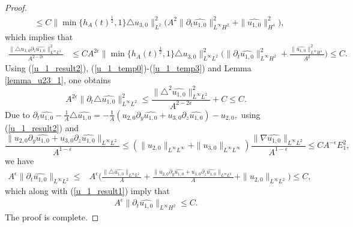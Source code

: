\documentclass[12pt, reqno]{amsart}
\numberwithin{equation}{section}
\begin{document}
\begin{proof}
\begin{equation*}
\begin{aligned}
				&\leq C\|\min\{h_A(t)^{\frac{1}{2}},1\}\triangle u_{3,0}\|^2_{L^2}
				\big(A^2\|\partial_t\widehat{u_{1,0}}\|^2_{L^{\infty}H^2}
				+\|\widehat{u_{1,0}}\|^2_{H^4}\big),
			\end{aligned}
		\end{equation*}
		which implies that 
		\begin{equation}\label{u_1_temp3}
			\begin{aligned}			
				\frac{\|\triangle u_{3,0}\partial_z\widehat{u_{1,0}}\|^2_{L^{\infty}L^2}}{A^{2-2\epsilon}}
				&\leq CA^{2\epsilon}\|\min\{h_A(t)^{\frac{1}{2}},1\}
				\triangle u_{3,0}\|^2_{L^{\infty}L^2}
				\Big(\|\partial_t\widehat{u_{1,0}}\|^2_{L^{\infty}H^2}
				+\frac{\|\widehat{u_{1,0}}\|^2_{L^{\infty}H^4}}{A^2}\Big)
				\leq C.
			\end{aligned}
		\end{equation}
		Using (\ref{u_1_result2}), (\ref{u_1_temp0})-(\ref{u_1_temp3}) and Lemma \ref{lemma_u23_1}, one obtains
		\begin{equation}\label{u_1_result1}
			A^{2\epsilon}\|\partial_t\triangle\widehat{u_{1,0}}\|^2_{L^{\infty}L^2}
			\leq \frac{\|\triangle^2\widehat{u_{1,0}}\|^2_{L^{\infty}L^2}}
			{A^{2-2\epsilon}}
			+ C\leq C.	
		\end{equation}
		Due to $\partial_t\widehat{u_{1,0}}-\frac{1}{A}\triangle\widehat{u_{1,0}}
		=-\frac{1}{A}(u_{2,0}\partial_y\widehat{u_{1,0}}+u_{3,0}\partial_z\widehat{u_{1,0}})-u_{2,0},$
		using (\ref{u_1_result2}) and 
		\begin{equation*}
			\frac{\|u_{2,0}\partial_y\widehat{u_{1,0}}
				+u_{3,0}\partial_z\widehat{u_{1,0}}\|_{L^{\infty}L^2}}{A^{1-\epsilon}}
			\leq (\|u_{2,0}\|_{L^{\infty}L^{\infty}}
			+\|u_{3,0}\|_{L^{\infty}L^{\infty}})
			\frac{\|\nabla\widehat{u_{1,0}}\|_{L^{\infty}L^2}}{A^{1-\epsilon}}
			\leq CA^{-\epsilon}E_1^2,
		\end{equation*} 
		we have 
		\begin{equation*}
			\begin{aligned}
				A^{\epsilon}\|\partial_t\widehat{u_{1,0}}\|_{L^{\infty}L^2}
				\leq& A^{\epsilon}
				\Big(\frac{\|\triangle\widehat{u_{1,0}}\|_{L^{\infty}L^2}}{A}
				+\frac{\|u_{2,0}\partial_y\widehat{u_{1,0}}
					+u_{3,0}\partial_z\widehat{u_{1,0}}\|_{L^{\infty}L^2}}{A}
				+\|u_{2,0}\|_{L^{\infty}L^2}\Big)
				\leq C,
			\end{aligned}
		\end{equation*}
		which along with (\ref{u_1_result1}) imply that 
		\begin{equation*}
			\begin{aligned}
				A^{\epsilon}\|\partial_t\widehat{u_{1,0}}\|_{L^{\infty}H^2}
				\leq C.
			\end{aligned}
		\end{equation*}
		The proof is complete.
	\end{proof}
	
\end{document}
